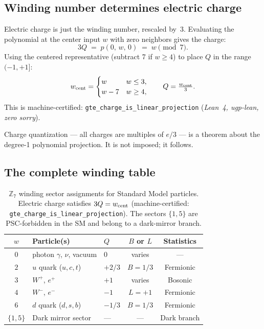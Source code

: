 \documentclass[11pt,a4paper]{article}
\newcommand{\lean}[1]{\texttt{#1}}
\newcommand{\ZS}{\mathbb{Z}_7}
\begin{document}
\subsection{Winding number determines electric charge}

Electric charge is just the winding number, rescaled by~3.  Evaluating the
polynomial at the center input $w$ with zero neighbors gives the charge:
\begin{equation}
  3Q \;=\; p(0,\, w,\, 0) \;=\; w \pmod{7}.
  \label{eq:charge}
\end{equation}
Using the centered representative (subtract 7 if $w \geq 4$) to place
$Q$ in the range $(-1, +1]$:
\[
  w_{\rm cent} = \begin{cases} w & w \leq 3,\\ w-7 & w \geq 4,\end{cases}
  \qquad Q = \tfrac{w_{\rm cent}}{3}.
\]
This is machine-certified:
\lean{gte\_charge\_is\_linear\_projection}
(\textit{Lean~4, ugp-lean, zero sorry}).

Charge quantization --- all charges are multiples of $e/3$ --- is a theorem
about the degree-1 polynomial projection.  It is not imposed; it follows.

\subsection{The complete winding table}

\begin{table}[htbp]
\centering
\caption{$\ZS$ winding sector assignments for Standard Model particles.
Electric charge satisfies $3Q = w_{\rm cent}$
(machine-certified: \lean{gte\_charge\_is\_linear\_projection}).
The sectors $\{1,5\}$ are PSC-forbidden in the SM and belong to a
dark-mirror branch.}
\label{tab:winding}
\setlength{\tabcolsep}{7pt}
\begin{tabular}{cllcc}
\toprule
$w$ & Particle(s) & $Q$ & $B$ or $L$ & Statistics \\
\midrule
$0$ & photon $\gamma$, $\nu$, vacuum & $0$ & varies & --- \\
$2$ & $u$ quark ($u,c,t$) & $+2/3$ & $B=1/3$ & Fermionic \\
$3$ & $W^+$, $e^+$ & $+1$ & varies & Bosonic \\
$4$ & $W^-$, $e^-$ & $-1$ & $L=+1$ & Fermionic \\
$6$ & $d$ quark ($d,s,b$) & $-1/3$ & $B=1/3$ & Fermionic \\
\midrule
$\{1,5\}$ & Dark mirror sector & --- & --- & Dark branch \\
\bottomrule
\end{tabular}
\end{table}
\end{document}
